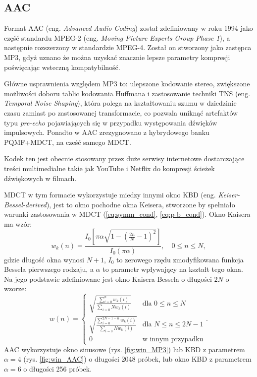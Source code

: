 \documentclass[pl,12pt]{aghdpl}
\let\Oldsubsection\subsection%
\renewcommand{\subsection}{\FloatBarrier\Oldsubsection}
\begin{document}
\subsection{AAC}
Format AAC (eng. \textit{Advanced Audio Coding}) został zdefiniowany w roku 1994
jako część standardu MPEG-2 (eng. \textit{Moving Picture Experts Group Phase
1}), a następnie rozszerzony w standardzie MPEG-4. Został on stworzony jako
zastępca MP3, gdyż uznano że można uzyskać znacznie lepsze parametry kompresji
poświęcając wsteczną kompatybilność.

Główne usprawnienia względem MP3 to: ulepszone kodowanie stereo, zwiększone
możliwości doboru tablic kodowania Huffmana i zastosowanie techniki TNS (eng.
\textit{Temporal Noise Shaping}), która polega na kształtowaniu szumu w
dziedzinie czasu zamiast po zastosowanej transformacie, co pozwala uniknąć
artefaktów typu \textit{pre-echo} pojawiających się w przypadku występowania
dźwięków impulsowych. Ponadto w AAC zrezygnowano z hybrydowego banku PQMF+MDCT,
na cześć samego MDCT.

Kodek ten jest obecnie stosowany przez duże serwisy internetowe dostarczające
treści multimedialne takie jak YouTube i Netflix do kompresji ścieżek
dźwiękowych w filmach.

MDCT w tym formacie wykorzystuje miedzy innymi okno KBD (eng.
\textit{Keiser-Bessel-derived}), jest to okno pochodne okna Keisera, stworzone
by spełniało warunki zastosowania w MDCT (\ref{eq:symm_cond},
\ref{eq:p-b_cond}). Okno Kaisera ma wzór:
\begin{equation}\label{eq:kaiser_win}
  w_k(n) = \frac{I_0\left[\pi\alpha\sqrt{1-\left(\frac{2n}{N}-1\right)^2}\right]}
  {I_0(\pi\alpha)},\quad 0 \leq n \leq N,
\end{equation}
gdzie długość okna wynosi $N+1$, $I_0$ to zerowego rzędu zmodyfikowana funkcja
Bessela pierwszego rodzaju, a $\alpha$ to parametr wpływający na kształt tego
okna. Na jego podstawie zdefiniowane jest okno Kaisera-Bessela o długości $2N$
o wzorze:
\begin{equation}\label{eq:kbd_win}
  w(n) = \begin{cases}
    \sqrt{\frac{\sum_{i=0}^{n}w_k(i)}{\sum_{i=0}{N}w_k(i)}} & \text{dla }0 \leq n \leq N \\
    \sqrt{\frac{\sum_{i=0}^{2N-1-n}w_k(i)}{\sum_{i=0}{N}w_k(i)}} & \text{dla }N \leq n \leq 2N-1 \\
    0 & \text{w innym przypadku}
  \end{cases}.
\end{equation}
AAC wykorzystuje okno sinusowe (rys. \ref{fig:win_MP3}) lub KBD z parametrem
$\alpha = 4$ (rys.  \ref{fig:win_AAC}) o długości 2048 próbek, lub okno KBD z
parametrem $\alpha = 6$ o długości 256 próbek.
\end{document}
